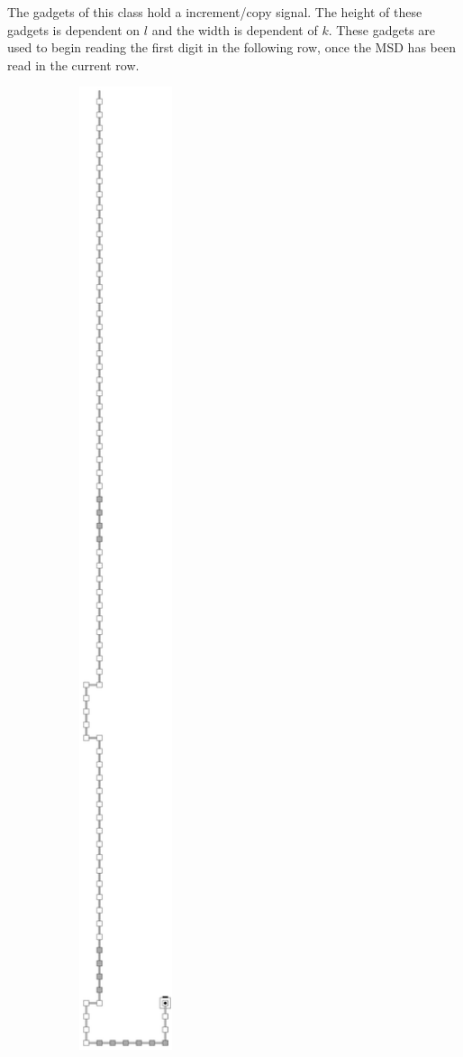         The gadgets of this class hold a increment/copy signal.
        The height of these gadgets is dependent on $l$ and the width is dependent of $k$.
        These gadgets are used to begin reading the first digit in the following row, once
        the MSD has been read in the current row.
        \vspace{1cm}

        \begin{figure}[H]
            \centering
            \begin{subfigure}[t]{0.3\textwidth}
                \centering
                \includegraphics[width=0.3\textwidth]{return_paths/return_digit1_read_next_row}

\end{subfigure}
\end{figure}

